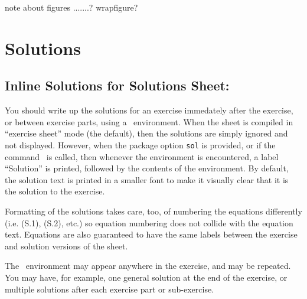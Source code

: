 \documentclass[11pt,a4paper]{article}
\begin{document}
note about figures .......?
wrapfigure?


\section{Solutions}
\label{sec:Solutions}

\subsection{Inline Solutions for Solutions Sheet: }

You should write up the solutions for an exercise immedately after the exercise, or
between exercise parts, using
a~ environment. When the sheet is compiled in ``exercise sheet'' mode
(the default), then the solutions are simply ignored and not displayed. However, when the
package option {\tt sol} is provided, or if the command~
is called, then whenever the environment  is encountered, a label
``Solution'' is printed, followed by the contents of the environment. By default, the
solution text is printed in a smaller font to make it visually clear that it is the
solution to the exercise.

Formatting of the solutions takes care, too, of numbering the equations differently
(i.e. (S.1), (S.2), etc.) so equation numbering does not collide with the equation
text. Equations are also guaranteed to have the same
labels between the exercise and solution versions of the sheet.

The~ environment may appear anywhere in the exercise, and may be
repeated. You may have, for example, one general solution at the end of the exercise, or
multiple solutions after each exercise part or sub-exercise.

\end{document}
